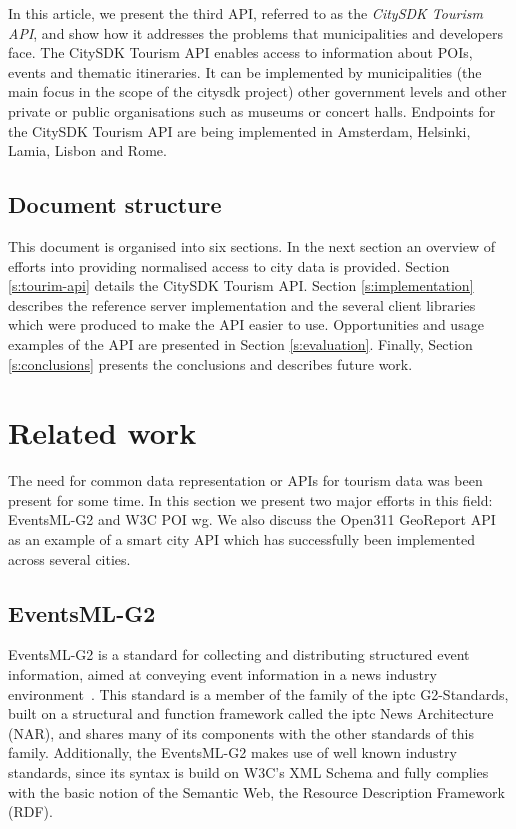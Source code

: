 \documentclass[times,doublespace]{ettauth}%
\begin{document}
In this article, we present the third API, referred to as the \emph{CitySDK Tourism API}, and show how it addresses the problems that municipalities and developers face. 
The CitySDK Tourism API enables access to information about \ac{POIs}, events and thematic itineraries.
It can be implemented by municipalities (the main focus in the scope of the \ac{citysdk} project) other government levels and other private or public organisations such as museums or concert halls.
Endpoints for the CitySDK Tourism API are being implemented in Amsterdam, Helsinki, Lamia, Lisbon and Rome.

\subsection{Document structure}
\label{s:structure}
This document is organised into six sections.
In the next section an overview of efforts into providing normalised access to city data is provided.
Section \ref{s:tourim-api} details the CitySDK Tourism API.
Section \ref{s:implementation} describes the reference server implementation and the several client libraries which were produced to make the API easier to use.
Opportunities and usage examples of the API are presented in Section \ref{s:evaluation}. 
Finally, Section \ref{s:conclusions} presents the conclusions and describes future work.



\section{Related work}
\label{s:related-work}
The need for common data representation or APIs for tourism data was been present for some time.
In this section we present two major efforts in this field:  EventsML-G2 and \ac{W3C} \ac{POI} \ac{wg}.
We also discuss the Open311 GeoReport API as an example of a smart city API which has successfully been implemented across several cities.

\subsection{EventsML-G2}
EventsML-G2 is a standard for collecting and distributing structured event information, aimed at conveying event information in a news industry environment~\cite{eventsml}. 
This standard is a member of the family of the \ac{iptc} G2-Standards, built on a structural and function framework called the \ac{iptc} News Architecture (NAR), and shares many of its components with the other standards of this family. 
Additionally, the EventsML-G2 makes use of well known industry standards, since its syntax is build on W3C's XML Schema and fully complies with the basic notion of the Semantic Web, the Resource Description Framework (RDF).
\end{document}
